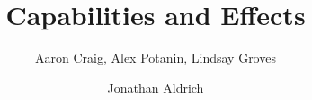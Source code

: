 \documentclass[sigplan,10pt]{acmart}\settopmatter{}
\begin{document}
\title[Capabilities and Effects]{Capabilities and Effects}


\author{Aaron Craig, Alex Potanin, Lindsay Groves}

\author{Jonathan Aldrich}

\end{document}
